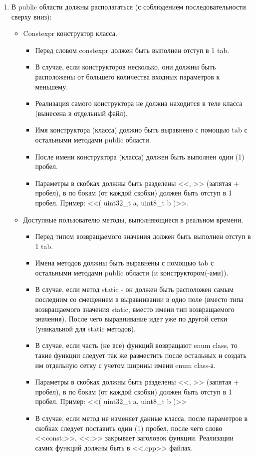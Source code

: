 \begin{enumerate}
	\item В public области должны располагаться (с соблюдением последовательности сверху вниз):
	\begin{itemize}
		\item Constexpr конструктор класса.
		\begin{itemize}
			\item Перед словом constexpr должен быть выполнен отступ в 1 tab.
			\item В случае, если конструкторов несколько, они должны быть расположены от большего количества входных параметров к меньшему.
			\item Реализация самого конструктора не должна находится в теле класса (вынесена в отдельный файл).
			\item Имя конструктора (класса) должно быть выравнено с помощью tab с остальными методами public области.
			\item После имени конструктора (класса) должен быть выполнен один (1) пробел. 
			\item Параметры в скобках должны быть разделены <<, >> (запятая + пробел), в по бокам (от каждой скобки) должен быть отступ в 1 пробел. Пример: <<( uint32\_t a, uint8\_t b )>>.
		\end{itemize}
		\item Доступные пользователю методы, выполняющиеся в реальном времени.
		\begin{itemize}
			\item Перед типом возвращаемого значения должен быть выполнен отступ в 1 tab.
			\item Имена методов должны быть выравнены с помощью tab с остальными методами public области (и конструктором(-ами)).
			\item В случае, если метод static - он должен быть расположен самым последним со смещением в выравнивании в одно поле (вместо типа возвращаемого значения static, вместо имени тип возвращаемого значения). После чего выравнивание идет уже по другой сетки (уникальной для static методов).
			\item В случае, если часть (не все) функций возвращают enum class, то такие функции следует так же разместить после остальных и создать им отдельную сетку с учетом ширины имени enum class-а.
			\item Параметры в скобках должны быть разделены <<, >> (запятая + пробел), в по бокам (от каждой скобки) должен быть отступ в 1 пробел. Пример: <<( uint32\_t a, uint8\_t b )>>
			\item В случае, если метод не изменяет данные класса, после параметров в скобках следует поставить один (1) пробел, после чего слово <<const;>>. <<;>> закрывает заголовок функции. Реализации самих функций должны быть в <<.cpp>> файлах.

\end{itemize}
\end{itemize}
\end{enumerate}
